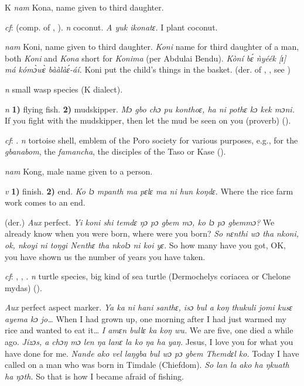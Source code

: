 \begin{letter}{K}
 \textit{nam} Kona, name given to third daughter. 

 \textit{cf}:  (comp. of , ). \textit{n} coconut. \textit{A yuk ikonatɛ.} I plant coconut.

 \textit{nam} Koni, name given to third daughter. \textit{Koni} name for third daughter of a man, both \textit{Koni} and \textit{Kona} short for \textit{Konima} (per Abdulai Bendu). \textit{Kòní bɛ́ ǹyéék [ɪ] má kómɔ̀wɛ̀ bààlàɛ́-áí.} Koni put the child's things in the basket.
  (der. of , , see ) 

 \textit{n} small wasp species (K dialect).

 \textit{n} \textbf{1)} flying fish. \textbf{2)} mudskipper. \textit{Mɔ gbo chɔ pu konthoɛ, ha ni pothɛ kɔ kek mɔni.} If you fight with the mudskipper, then let the mud be seen on you (proverb) (\citealt{TISLL1979}).

 \textit{cf}: . \textit{n} tortoise shell, emblem of the Poro society for various purposes, e.g., for the \textit{gbanabom}, the \textit{famancha}, the disciples of the Taso or Kase (\citealt{Pichl1967}). 

 \textit{nam} Kong, male name given to a person. 

 \textit{v} \textbf{1)} finish. \textbf{2)} end. \textit{Ko lɔ mpanth ma pɛlɛ ma ni hun koŋdɛ.} Where the rice farm work comes to an end.

 (der.) \textit{Aux} perfect. \textit{Yi koni shi temdɛ ŋɔ pɔ gbem mɔ, ko lɔ pɔ gbemmɔ?} We already know when you were born, where were you born? \textit{So nɛnthi wɔ tha nkoni, ok, nkoyi ni toŋgi Nenthɛ tha nkolɔ ni koi yɛ.} So how many have you got, OK, you have shown us the number of years you have taken.

 \textit{cf}: , , . \textit{n} turtle species, big kind of sea turtle (Dermochelys coriacea or Chelone mydas) (\citealt{Pichl1967}). 

 \textit{Aux} perfect aspect marker. \textit{Ya ka ni hani santhɛ, isɔ bul a koŋ thukuli jomi kusɛ ayema kɔ jo…} When I had grown up, one morning after I had just warmed my rice and wanted to eat it… \textit{I amɛn bullɛ ka koŋ wu.} We are five, one died a while ago. \textit{Jizɔs, a chɔŋ mɔ len ŋa lanɛ la ko ŋa ha yaŋ.} Jesus, I love you for what you have done for me. \textit{Nande ako vel laŋgba bul wɔ pɔ gbem Themdɛl ko.} Today I have called on a man who was born in Timdale (Chiefdom). \textit{So lan la ako ha ŋkuath ha ŋɔth.} So that is how I became afraid of fishing.


\end{letter}
